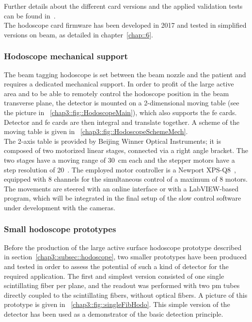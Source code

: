 Further details about the different card versions and the applied validation tests can be found in~\cite{Chen2017}.\\
The hodoscope card firmware has been developed in 2017 and tested in simplified versions on beam, as detailed in chapter~\ref{chap::6}.
           

\subsubsection{Hodoscope mechanical support}\label{chap3::subsubsec::HodoMechanics}

The beam tagging hodoscope is set between the beam nozzle and the patient and requires a dedicated mechanical support. In order to profit of the large active area and to be able to remotely control the hodoscope position in the beam transverse plane, the detector is mounted on a 2-dimensional moving table (see the picture in \figurename~\ref{chap3::fig::HodoscopeMain}), which also supports the \gls{fe} cards. Detector and \gls{fe} cards are then integral and translate together. A scheme of the moving table is given in \figurename~\ref{chap3::fig::HodoscopeSchemeMech}.\\
The 2-axis table is provided by Beijing Winner Optical Instruments; it is composed of two motorized linear stages, connected via a right angle bracket. The two stages have a moving range of 30~cm each and the stepper motors have a step resolution of 20~\charmum. The employed motor controller is a Newport XPS-Q8~\parencite{Newport2017}, equipped with 8 channels for the simultaneous control of a maximum of 8 motors. The movements are steered with an online interface or with a LabVIEW-based program, which will be integrated in the final setup of the slow control software under development with the cameras.

\subsubsection{Small hodoscope prototypes}\label{chap3::subsubsec::SmallHodoProto}
Before the production of the large active surface hodoscope prototype described in section~\ref{chap3::subsec::hodoscope}, two smaller prototypes have been produced and tested in order to assess the potential of such a kind of detector for the required application. The first and simplest version consisted of one single scintillating fiber per plane, and the readout was performed with two \gls{pm} tubes directly coupled to the scintillating fibers, without optical fibers. A picture of this prototype is given in \figurename~\ref{chap3::fig::singleFibHodo}. This simple version of the detector has been used as a demonstrator of the basic detection principle.\\ 

